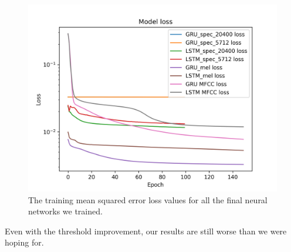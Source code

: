 \begin{figure}[h]
    \centering
	\includegraphics[width=120mm]{./img/all_training_graphs.png}
	\caption{The training mean squared error loss values for all the final neural networks we trained.}
	\label{fig:all_model_training}
\end{figure}

Even with the threshold improvement, our results are still worse than we were hoping for. 


